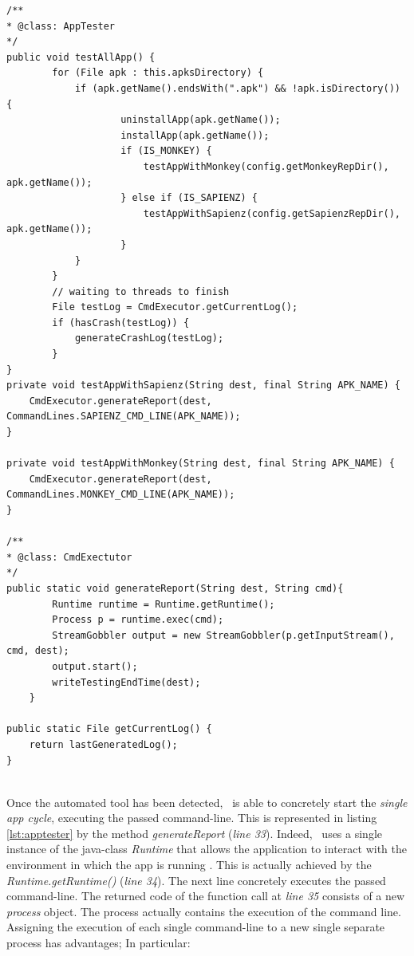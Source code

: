 \clearpage
\begin{lstlisting}[caption=Testing mechanism between \AppTester\ and \Cmd\, ,label={lst:apptester}]
/**
* @class: AppTester
*/
public void testAllApp() {
        for (File apk : this.apksDirectory) {
            if (apk.getName().endsWith(".apk") && !apk.isDirectory()) {
                    uninstallApp(apk.getName());
                    installApp(apk.getName());
                    if (IS_MONKEY) {
                        testAppWithMonkey(config.getMonkeyRepDir(), apk.getName());
                    } else if (IS_SAPIENZ) {
                        testAppWithSapienz(config.getSapienzRepDir(), apk.getName());
                    }
            }
        } 
        // waiting to threads to finish 
        File testLog = CmdExecutor.getCurrentLog();
        if (hasCrash(testLog)) {
            generateCrashLog(testLog);
        }
} 
private void testAppWithSapienz(String dest, final String APK_NAME) {
	CmdExecutor.generateReport(dest, CommandLines.SAPIENZ_CMD_LINE(APK_NAME)); 
}

private void testAppWithMonkey(String dest, final String APK_NAME) {
	CmdExecutor.generateReport(dest, CommandLines.MONKEY_CMD_LINE(APK_NAME)); 
}

/**
* @class: CmdExectutor
*/
public static void generateReport(String dest, String cmd){
        Runtime runtime = Runtime.getRuntime();
        Process p = runtime.exec(cmd);
        StreamGobbler output = new StreamGobbler(p.getInputStream(), cmd, dest); 
        output.start();
        writeTestingEndTime(dest);
    }
    
public static File getCurrentLog() {
    return lastGeneratedLog();
}
    
\end{lstlisting}
\clearpage 
Once the automated tool has been detected, \Cmd\ is able to concretely start the \textit{single app cycle}, executing the passed command-line. This is represented in listing \ref{lst:apptester} by the method \textit{generateReport} (\textit{line 33}). Indeed, \Cmd\ uses a single instance of the java-class \textit{Runtime} that allows the application to interact with the environment in which the app is running \cite{runtime}. 
This is actually achieved by the \textit{Runtime.getRuntime()} (\textit{line 34}). The next line concretely executes the passed command-line. 
The returned code of the function call at \textit{line 35} consists of a new \textit{process} object. 
The process actually contains the execution of the command line. 
Assigning the execution of each single command-line to a new single separate process has advantages; In particular: 

